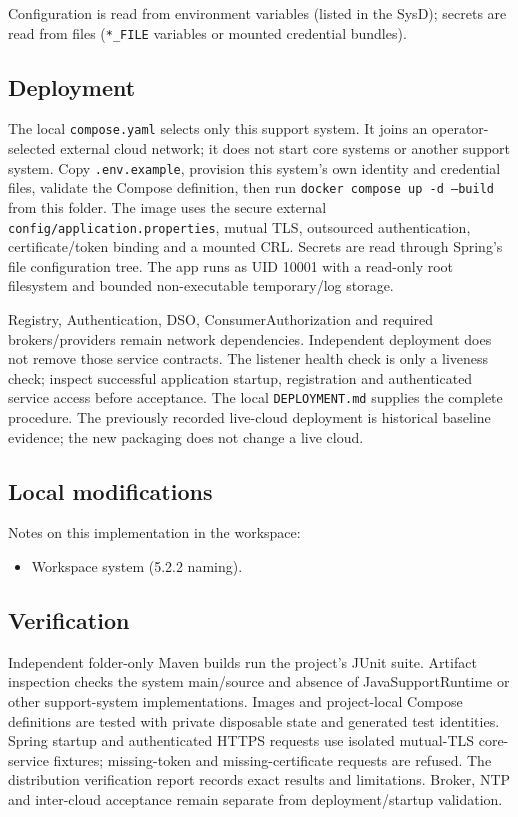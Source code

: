 \documentclass[a4paper]{arrowhead}
\begin{document}
Configuration is read from environment variables (listed in the SysD); secrets are read from files (\texttt{*\_\allowbreak{}FILE} variables or mounted credential bundles).

\subsection{Deployment}

The local \texttt{compose.yaml} selects only this support system. It joins an operator-selected external cloud network; it does not start core systems or another support system. Copy \texttt{.env.example}, provision this system's own identity and credential files, validate the Compose definition, then run \texttt{docker compose up -d --build} from this folder. The image uses the secure external \texttt{config/application.properties}, mutual TLS, outsourced authentication, certificate/token binding and a mounted CRL. Secrets are read through Spring's file configuration tree. The app runs as UID 10001 with a read-only root filesystem and bounded non-executable temporary/log storage.

Registry, Authentication, DSO, ConsumerAuthorization and required brokers/providers remain network dependencies. Independent deployment does not remove those service contracts. The listener health check is only a liveness check; inspect successful application startup, registration and authenticated service access before acceptance. The local \texttt{DEPLOYMENT.md} supplies the complete procedure. The previously recorded live-cloud deployment is historical baseline evidence; the new packaging does not change a live cloud.

\subsection{Local modifications}
\label{sec:local}

Notes on this implementation in the workspace:
\begin{itemize}
  \item Workspace system (5.2.2 naming).
\end{itemize}

\subsection{Verification}

Independent folder-only Maven builds run the project's JUnit suite. Artifact inspection checks the system main/source and absence of JavaSupportRuntime or other support-system implementations. Images and project-local Compose definitions are tested with private disposable state and generated test identities. Spring startup and authenticated HTTPS requests use isolated mutual-TLS core-service fixtures; missing-token and missing-certificate requests are refused. The distribution verification report records exact results and limitations. Broker, NTP and inter-cloud acceptance remain separate from deployment/startup validation.
\end{document}
